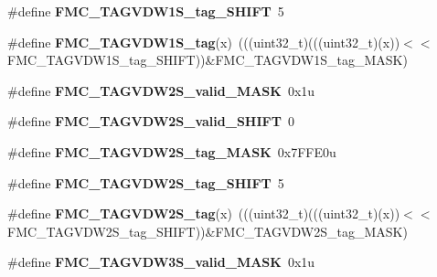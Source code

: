 \begin{DoxyCompactItemize}
\item 
\#define {\bfseries F\+M\+C\+\_\+\+T\+A\+G\+V\+D\+W1\+S\+\_\+tag\+\_\+\+S\+H\+I\+FT}~5\hypertarget{group__FMC__Register__Masks_ga796e1287dc06a1ccce8dde2de6ec177e}{}\label{group__FMC__Register__Masks_ga796e1287dc06a1ccce8dde2de6ec177e}

\item 
\#define {\bfseries F\+M\+C\+\_\+\+T\+A\+G\+V\+D\+W1\+S\+\_\+tag}(x)~(((uint32\+\_\+t)(((uint32\+\_\+t)(x))$<$$<$F\+M\+C\+\_\+\+T\+A\+G\+V\+D\+W1\+S\+\_\+tag\+\_\+\+S\+H\+I\+FT))\&F\+M\+C\+\_\+\+T\+A\+G\+V\+D\+W1\+S\+\_\+tag\+\_\+\+M\+A\+SK)\hypertarget{group__FMC__Register__Masks_gaee2594ff5f366b6b15fbf97934a7096b}{}\label{group__FMC__Register__Masks_gaee2594ff5f366b6b15fbf97934a7096b}

\item 
\#define {\bfseries F\+M\+C\+\_\+\+T\+A\+G\+V\+D\+W2\+S\+\_\+valid\+\_\+\+M\+A\+SK}~0x1u\hypertarget{group__FMC__Register__Masks_ga9a9bd5d3c2ddb39468a566b7b33a67af}{}\label{group__FMC__Register__Masks_ga9a9bd5d3c2ddb39468a566b7b33a67af}

\item 
\#define {\bfseries F\+M\+C\+\_\+\+T\+A\+G\+V\+D\+W2\+S\+\_\+valid\+\_\+\+S\+H\+I\+FT}~0\hypertarget{group__FMC__Register__Masks_ga7114b81f80486097779a48dbcf61574f}{}\label{group__FMC__Register__Masks_ga7114b81f80486097779a48dbcf61574f}

\item 
\#define {\bfseries F\+M\+C\+\_\+\+T\+A\+G\+V\+D\+W2\+S\+\_\+tag\+\_\+\+M\+A\+SK}~0x7\+F\+F\+E0u\hypertarget{group__FMC__Register__Masks_gae2165ed5443bbd561078fa2ff8bf30e5}{}\label{group__FMC__Register__Masks_gae2165ed5443bbd561078fa2ff8bf30e5}

\item 
\#define {\bfseries F\+M\+C\+\_\+\+T\+A\+G\+V\+D\+W2\+S\+\_\+tag\+\_\+\+S\+H\+I\+FT}~5\hypertarget{group__FMC__Register__Masks_ga5e8d91c514d82c1ce5419cf5120ba178}{}\label{group__FMC__Register__Masks_ga5e8d91c514d82c1ce5419cf5120ba178}

\item 
\#define {\bfseries F\+M\+C\+\_\+\+T\+A\+G\+V\+D\+W2\+S\+\_\+tag}(x)~(((uint32\+\_\+t)(((uint32\+\_\+t)(x))$<$$<$F\+M\+C\+\_\+\+T\+A\+G\+V\+D\+W2\+S\+\_\+tag\+\_\+\+S\+H\+I\+FT))\&F\+M\+C\+\_\+\+T\+A\+G\+V\+D\+W2\+S\+\_\+tag\+\_\+\+M\+A\+SK)\hypertarget{group__FMC__Register__Masks_ga5bab632691e7c7f54e28b42b0898fbaf}{}\label{group__FMC__Register__Masks_ga5bab632691e7c7f54e28b42b0898fbaf}

\item 
\#define {\bfseries F\+M\+C\+\_\+\+T\+A\+G\+V\+D\+W3\+S\+\_\+valid\+\_\+\+M\+A\+SK}~0x1u\hypertarget{group__FMC__Register__Masks_ga3f4eebc3416cc79b7c513a836b8b670b}{}\label{group__FMC__Register__Masks_ga3f4eebc3416cc79b7c513a836b8b670b}


\end{DoxyCompactItemize}
